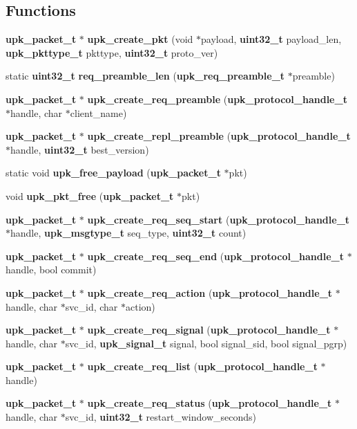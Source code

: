 \subsection*{Functions}
\begin{DoxyCompactItemize}
\item 
{\bf upk\_\-packet\_\-t} $\ast$ {\bf upk\_\-create\_\-pkt} (void $\ast$payload, {\bf uint32\_\-t} payload\_\-len, {\bf upk\_\-pkttype\_\-t} pkttype, {\bf uint32\_\-t} proto\_\-ver)
\item 
static {\bf uint32\_\-t} {\bf req\_\-preamble\_\-len} ({\bf upk\_\-req\_\-preamble\_\-t} $\ast$preamble)
\item 
{\bf upk\_\-packet\_\-t} $\ast$ {\bf upk\_\-create\_\-req\_\-preamble} ({\bf upk\_\-protocol\_\-handle\_\-t} $\ast$handle, char $\ast$client\_\-name)
\item 
{\bf upk\_\-packet\_\-t} $\ast$ {\bf upk\_\-create\_\-repl\_\-preamble} ({\bf upk\_\-protocol\_\-handle\_\-t} $\ast$handle, {\bf uint32\_\-t} best\_\-version)
\item 
static void {\bf upk\_\-free\_\-payload} ({\bf upk\_\-packet\_\-t} $\ast$pkt)
\item 
void {\bf upk\_\-pkt\_\-free} ({\bf upk\_\-packet\_\-t} $\ast$pkt)
\item 
{\bf upk\_\-packet\_\-t} $\ast$ {\bf upk\_\-create\_\-req\_\-seq\_\-start} ({\bf upk\_\-protocol\_\-handle\_\-t} $\ast$handle, {\bf upk\_\-msgtype\_\-t} seq\_\-type, {\bf uint32\_\-t} count)
\item 
{\bf upk\_\-packet\_\-t} $\ast$ {\bf upk\_\-create\_\-req\_\-seq\_\-end} ({\bf upk\_\-protocol\_\-handle\_\-t} $\ast$handle, bool commit)
\item 
{\bf upk\_\-packet\_\-t} $\ast$ {\bf upk\_\-create\_\-req\_\-action} ({\bf upk\_\-protocol\_\-handle\_\-t} $\ast$handle, char $\ast$svc\_\-id, char $\ast$action)
\item 
{\bf upk\_\-packet\_\-t} $\ast$ {\bf upk\_\-create\_\-req\_\-signal} ({\bf upk\_\-protocol\_\-handle\_\-t} $\ast$handle, char $\ast$svc\_\-id, {\bf upk\_\-signal\_\-t} signal, bool signal\_\-sid, bool signal\_\-pgrp)
\item 
{\bf upk\_\-packet\_\-t} $\ast$ {\bf upk\_\-create\_\-req\_\-list} ({\bf upk\_\-protocol\_\-handle\_\-t} $\ast$handle)
\item 
{\bf upk\_\-packet\_\-t} $\ast$ {\bf upk\_\-create\_\-req\_\-status} ({\bf upk\_\-protocol\_\-handle\_\-t} $\ast$handle, char $\ast$svc\_\-id, {\bf uint32\_\-t} restart\_\-window\_\-seconds)
\item 

\end{DoxyCompactItemize}
